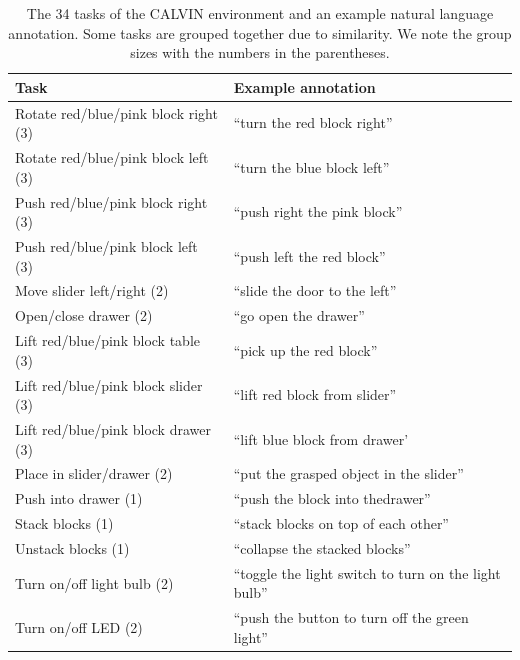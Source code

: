 \documentclass[../main.tex]{subfiles}
\begin{document}
\begin{table}[t]
	\centering
	\caption[The 34 tasks of the CALVIN environment]{The 34 tasks of the CALVIN environment and an
		example natural language annotation. Some tasks are grouped together due to similarity. We note
		the group sizes with the numbers in the parentheses.}
	\label{tab:calvin-tasks}
	\footnotesize
	\begin{tabular}{@{}ll@{}}
		\toprule
		Task                                 & Example annotation                                    \\ \midrule
		Rotate red/blue/pink block right (3) & ``turn the red block right''                          \\
		Rotate red/blue/pink block left (3)  & ``turn the blue block left''                          \\
		Push red/blue/pink block right (3)   & ``push right the pink block''                         \\
		Push red/blue/pink block left (3)    & ``push left the red block''                           \\
		Move slider left/right (2)           & ``slide the door to the left''                        \\
		Open/close drawer (2)                & ``go open the drawer''                                \\
		Lift red/blue/pink block table (3)   & ``pick up the red block''                             \\
		Lift red/blue/pink block slider (3)  & ``lift red block from slider''                        \\
		Lift red/blue/pink block drawer (3)  & ``lift blue block from drawer'                        \\
		Place in slider/drawer (2)           & ``put the grasped object in the slider''              \\
		Push into drawer (1)                 & ``push the block into thedrawer''                     \\
		Stack blocks (1)                     & ``stack blocks on top of each other''                 \\
		Unstack blocks (1)                   & ``collapse the stacked blocks''                       \\
		Turn on/off light bulb (2)           & ``toggle the light switch to turn on the light bulb'' \\
		Turn on/off LED (2)                  & ``push the button to turn off the green light''       \\ \bottomrule
	\end{tabular}
\end{table}
\end{document}
